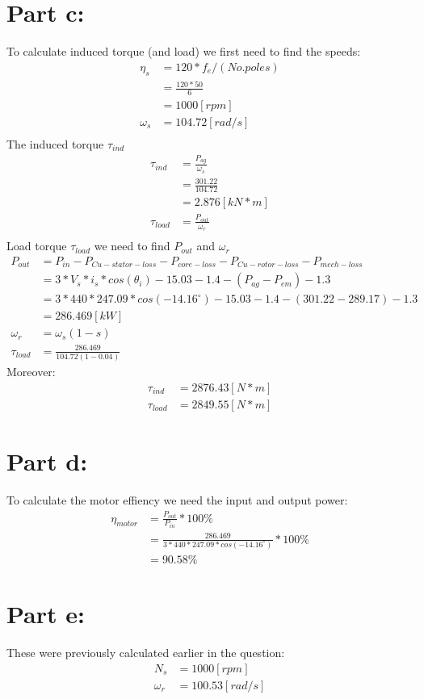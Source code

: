 \documentclass{article}
\begin{document}
\section*{Part c:}
To calculate induced torque (and load) we first need to find the speeds:
\begin{align*}
    \eta_s &= 120 * f_e / (No. poles) \\
    &= \frac{120*50}{6}\\
    &= 1000 [rpm]\\
    \omega_s &= 104.72 [rad/s]\\
\end{align*}
The induced torque $\tau_{ind}$ 
\begin{align*}
    \tau_{ind} &= \frac{P_{ag}}{\omega_s}\\
    &= \frac{301.22}{104.72}\\
    &= 2.876 [kN*m]\\
    \tau_{load} &= \frac{P_{out}}{\omega_r}\\
\end{align*}
Load torque $\tau_{load}$ we need to find $P_{out}$ and $\omega_r$\\
\begin{align*}
    P_{out} &= P_{in} - P_{Cu-stator-loss} - P_{core-loss} -P_{Cu-rotor-loss} - P_{mech-loss} \\ 
    &= 3*V_s*i_s*cos(\theta_i) - 15.03 - 1.4 - (P_{ag} - P_{em}) - 1.3\\
    &= 3*440*247.09*cos(-14.16^{\circ})-15.03 - 1.4 - (301.22 - 289.17) - 1.3\\
    &= 286.469 [kW]\\
    \omega_r &= \omega_s (1-s) \\
    \tau_{load} &= \frac{286.469}{104.72(1-0.04)}
\end{align*}
Moreover:
\begin{align*}
    \tau_{ind} &= 2876.43 [N*m]\\
    \tau_{load} &= 2849.55 [N*m]
\end{align*}
\section*{Part d:}
To calculate the motor effiency we need the input and output power:
\begin{align*}
    \eta_{motor} &= \frac{P_{out}}{P_{in}}*100\%\\
    &= \frac{286.469}{3*440*247.09*cos(-14.16^{\circ})}*100\%\\
    &= 90.58\%
\end{align*}
\section*{Part e:}
These were previously calculated earlier in the question:
\begin{align*}
    N_s &= 1000 [rpm]\\
    \omega_r &= 100.53 [rad/s]
\end{align*}
\end{document}
